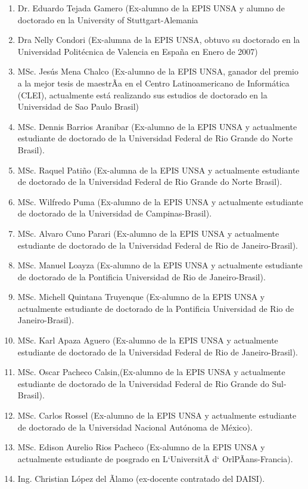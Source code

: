 \begin{enumerate}
\item Dr. Eduardo Tejada Gamero (Ex-alumno de la EPIS UNSA y alumno de doctorado en la University of Stuttgart-Alemania
\item Dra Nelly Condori (Ex-alumna de la EPIS UNSA, obtuvo su doctorado en la Universidad Politécnica de Valencia en España en Enero de 2007)
\item MSc. Jesús Mena Chalco (Ex-alumno de la EPIS UNSA, ganador del premio a la mejor tesis de maestrÃ­a en el Centro Latinoamericano de Informática (CLEI), actualmente está realizando sus estudios de doctorado en la Universidad de Sao Paulo Brasil)
\item MSc. Dennis Barrios Aranibar (Ex-alumno de la EPIS UNSA y actualmente estudiante de doctorado de la Universidad Federal de Rio Grande do Norte Brasil).
\item MSc. Raquel Patiño (Ex-alumna de la EPIS UNSA y actualmente estudiante de doctorado de la Universidad Federal de Rio Grande do Norte Brasil).
\item MSc. Wilfredo Puma (Ex-alumno de la EPIS UNSA y actualmente estudiante de doctorado de la Universidad de Campinas-Brasil).
\item MSc. Alvaro Cuno Parari (Ex-alumno de la EPIS UNSA y actualmente estudiante de doctorado de la Universidad Federal de Rio de Janeiro-Brasil).
\item MSc. Manuel Loayza (Ex-alumno de la EPIS UNSA y actualmente estudiante de doctorado de la Pontificia Universidad de Rio de Janeiro-Brasil).
\item MSc. Michell Quintana Truyenque (Ex-alumno de la EPIS UNSA y actualmente estudiante de doctorado de la Pontificia Universidad de Rio de Janeiro-Brasil).
\item MSc. Karl Apaza Aguero (Ex-alumno de la EPIS UNSA y actualmente estudiante de doctorado de la Universidad Federal de Rio de Janeiro-Brasil).
\item MSc. Oscar Pacheco Calsin,(Ex-alumno de la EPIS UNSA y actualmente estudiante de doctorado de la Universidad Federal de Rio Grande do Sul-Brasil).
\item MSc. Carlos Rossel (Ex-alumno de la EPIS UNSA y actualmente estudiante de doctorado de la Universidad Nacional Autónoma de México).
\item MSc. Edison Aurelio Rios Pacheco (Ex-alumno de la EPIS UNSA y actualmente estudiante de posgrado en L`UniversitÃ d` OrlPÃans-Francia).
\item Ing. Christian López del Ãlamo (ex-docente contratado del DAISI).
\end{enumerate}
